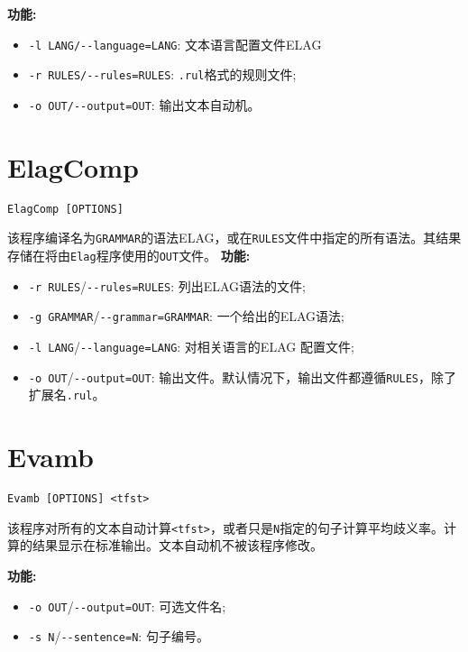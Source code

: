 \bigskip
\noindent \textbf{功能:}
\begin{itemize}
\item \verb+-l LANG/--language=LANG+: 文本语言配置文件ELAG
  \item \verb+-r RULES/--rules=RULES+: \verb+.rul+格式的规则文件;
  \item \verb+-o OUT/--output=OUT+: 输出文本自动机。
\end{itemize}







\section{ElagComp}
\verb+ElagComp [OPTIONS]+

\bigskip
\noindent 该程序编译名为\verb+GRAMMAR+的语法ELAG，或在\verb+RULES+文件中指定的所有语法。其结果存储在将由\verb+Elag+程序使用的\verb+OUT+文件。
\bigskip
\noindent \textbf{功能:}
\begin{itemize}
  \item \verb+-r RULES+/\verb+--rules=RULES+: 列出ELAG语法的文件;
  \item \verb+-g GRAMMAR+/\verb+--grammar=GRAMMAR+: 一个给出的ELAG语法;
  \item \verb+-l LANG+/\verb+--language=LANG+: 对相关语言的ELAG 配置文件;
  \item \verb+-o OUT+/\verb+--output=OUT+: 输出文件。默认情况下，输出文件都遵循\verb+RULES+，除了扩展名\verb+.rul+。 
\end{itemize}








\section{Evamb}
\verb+Evamb [OPTIONS] <tfst>+

\bigskip
\noindent 该程序对所有的文本自动计算\verb+<tfst>+，或者只是\verb+N+指定的句子计算平均歧义率。计算的结果显示在标准输出。文本自动机不被该程序修改。

\bigskip
\noindent \textbf{功能:}
\begin{itemize}
\item \verb+-o OUT+/\verb+--output=OUT+: 可选文件名;
  \item \verb+-s N+/\verb+--sentence=N+: 句子编号。
\end{itemize}








